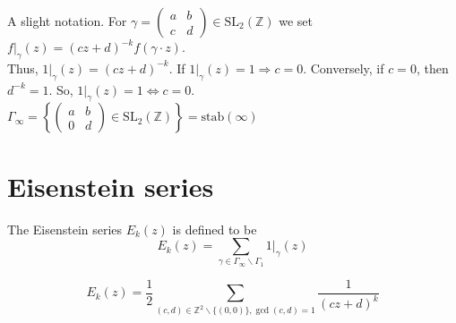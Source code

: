 \documentclass[oneside, 12pt]{scrbook}
\newcommand{\ZZ}{\mathbb Z}
\theoremstyle{theorem}
\begin{document}
A slight notation. For $\gamma  = \begin{pmatrix}
a & b \\ c & d
\end{pmatrix} \in \mathrm{SL}_{2} (\ZZ)$ we set $f|_{\gamma} (z) = (cz+d)^{-k}f(\gamma \cdot z)$. \\
Thus, $1|_{\gamma}(z) = (cz+d)^{-k}$. If $1|_{\gamma}(z) =1 \Rightarrow c =0$. Conversely, if $c=0$, then $d^{-k}=1$. So, $1|_{\gamma}(z)=1 \Leftrightarrow c=0$. \\
$\Gamma_{\infty} = \left\{ \begin{pmatrix}
a & b \\ 0 & d 
\end{pmatrix} \in \mathrm{SL}_{2}(\ZZ) \right\} = \mathrm{stab}(\infty)$

\section{Eisenstein series}

\begin{definition}
The Eisenstein series $E_{k}(z)$ is defined to be $$E_{k}(z) = \sum_{\gamma \in \Gamma_{\infty} \backslash \Gamma_{1}} 1|_{\gamma}(z)$$
\end{definition}

\begin{proposition}
$$E_{k}(z) = \frac{1}{2} \sum_{(c,d) \in \ZZ^{2} \backslash \{(0,0)\}, \gcd(c,d)=1} \frac{1}{(cz+d)^k}$$
\end{proposition}
\end{document}

